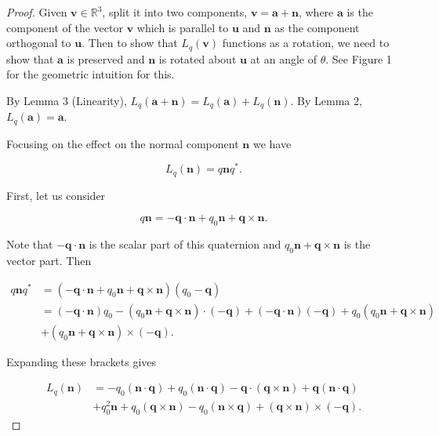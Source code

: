 \documentclass[a4paper, 11pt]{article}
\begin{document}
\begin{proof}

Given $\boldsymbol{v} \in \mathbb{R}^3$, split it into two components, $\boldsymbol{v} = \boldsymbol{a} +\boldsymbol{n}$, where $\boldsymbol{a}$ is the component of the vector $\boldsymbol{v}$ which is parallel to  $\boldsymbol{u}$ and $\boldsymbol{n}$ as the component orthogonal to $\boldsymbol{u}$. Then to show that $L_q(\boldsymbol{v})$ functions as a rotation, we need to show that $\boldsymbol{a}$ is preserved and $\boldsymbol{n}$ is rotated about $\boldsymbol{u}$ at an angle of $\theta$. See Figure 1 for the geometric intuition for this.

By Lemma 3 (Linearity), $L_q(\boldsymbol{a} + \boldsymbol{n}) = L_q(\boldsymbol{a}) + L_q(\boldsymbol{n})$. By Lemma 2, $L_q(\boldsymbol{a}) = \boldsymbol{a}$.

 Focusing on the effect on the normal component $\boldsymbol{n}$ we have

\[L_q(\boldsymbol{n}) = q\boldsymbol{n}q^*.\]

First, let us consider 

\[q\boldsymbol{n} = -\boldsymbol{q} \cdot \boldsymbol{n}  +q_0\boldsymbol{n} + \boldsymbol{q} \times \boldsymbol{n}.\]

Note that $-\boldsymbol{q} \cdot \boldsymbol{n}$ is the scalar part of this quaternion and $q_0\boldsymbol{n} + \boldsymbol{q} \times \boldsymbol{n}$ is the vector part. Then

\[ \begin{aligned}
q\boldsymbol{n}q^* &= (-\boldsymbol{q} \cdot \boldsymbol{n}  +q_0\boldsymbol{n} + \boldsymbol{q} \times \boldsymbol{n})(q_0 - \boldsymbol{q})\\
&= (-\boldsymbol{q} \cdot \boldsymbol{n})q_0  - (q_0\boldsymbol{n} + \boldsymbol{q} \times \boldsymbol{n})\cdot (-\boldsymbol{q}) +(-\boldsymbol{q} \cdot \boldsymbol{n})(-\boldsymbol{q}) +q_0(q_0\boldsymbol{n} + \boldsymbol{q} \times \boldsymbol{n})\\ &+(q_0\boldsymbol{n}+ \boldsymbol{q} \times \boldsymbol{n}) \times (-\boldsymbol{q}).
\end{aligned}
\]

Expanding these brackets gives 

\[
\begin{aligned}L_q(\boldsymbol{n})&=-q_0(\boldsymbol{n}\cdot \boldsymbol{q}) +q_0(\boldsymbol{n}\cdot \boldsymbol{q})  -\boldsymbol{q} \cdot (\boldsymbol{q}\times\boldsymbol{n})+ \boldsymbol{q}(\boldsymbol{n} \cdot \boldsymbol{q})\\ &+ q_0^2 \boldsymbol{n} + q_0(\boldsymbol{q}\times \boldsymbol{n}) - q_0(\boldsymbol{n} \times \boldsymbol{q}) + (\boldsymbol{q} \times \boldsymbol{n} ) \times (-\boldsymbol{q}).\end{aligned}
\]


\end{proof}
\end{document}
